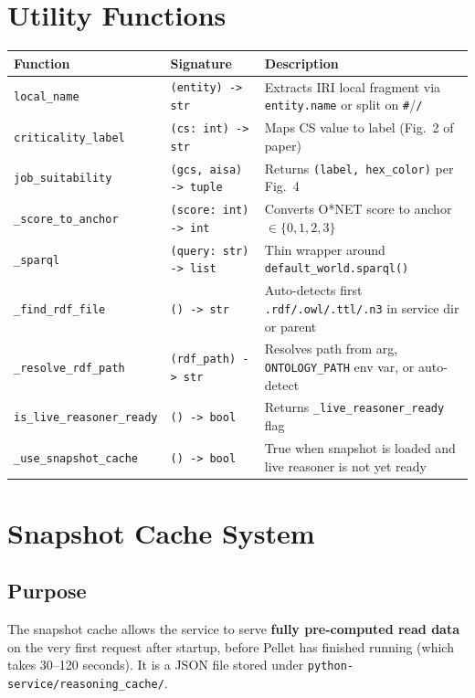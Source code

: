 ﻿\documentclass[12pt,a4paper]{article}
\begin{document}
\clearpage
\section{Utility Functions}

\begin{longtable}{@{}P{4cm}P{4cm}P{7cm}@{}}
\toprule
\textbf{Function} & \textbf{Signature} & \textbf{Description} \\
\midrule
\endhead
\texttt{local\_name} & \texttt{(entity) -> str} & Extracts IRI local fragment via \texttt{entity.name} or split on \texttt{\#}/\texttt{/} \\
\texttt{criticality\_label} & \texttt{(cs: int) -> str} & Maps CS value to label (Fig.~2 of paper) \\
\texttt{job\_suitability} & \texttt{(gcs, aisa) -> tuple} & Returns \texttt{(label, hex\_color)} per Fig.~4 \\
\texttt{\_score\_to\_anchor} & \texttt{(score: int) -> int} & Converts O*NET score to anchor $\in \{0,1,2,3\}$ \\
\texttt{\_sparql} & \texttt{(query: str) -> list} & Thin wrapper around \texttt{default\_world.sparql()} \\
\texttt{\_find\_rdf\_file} & \texttt{() -> str} & Auto-detects first \texttt{.rdf/.owl/.ttl/.n3} in service dir or parent \\
\texttt{\_resolve\_rdf\_path} & \texttt{(rdf\_path) -> str} & Resolves path from arg, \texttt{ONTOLOGY\_PATH} env var, or auto-detect \\
\texttt{is\_live\_reasoner\_ready} & \texttt{() -> bool} & Returns \texttt{\_live\_reasoner\_ready} flag \\
\texttt{\_use\_snapshot\_cache} & \texttt{() -> bool} & True when snapshot is loaded and live reasoner is not yet ready \\
\bottomrule
\end{longtable}

\clearpage
\section{Snapshot Cache System}

\subsection{Purpose}

The snapshot cache allows the service to serve \textbf{fully pre-computed read data} on the very first request after startup, before Pellet has finished running (which takes 30--120 seconds). It is a JSON file stored under \texttt{python-service/reasoning\_cache/}.
\end{document}
